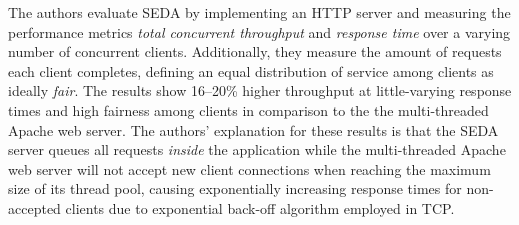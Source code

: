 \documentclass[12pt,a4paper]{book}
\begin{document}
The authors evaluate SEDA by implementing an HTTP server and measuring the performance metrics \emph{total concurrent throughput} and \emph{response time} over a varying number of concurrent clients.
Additionally, they measure the amount of requests each client completes, defining an equal distribution of service among clients as ideally \emph{fair}. %
The results show 16--20\% higher throughput at little-varying response times and high fairness among clients in comparison to the the multi-threaded Apache web server. %
The authors' explanation for these results is that the SEDA server queues all requests \emph{inside} the application while the multi-threaded Apache web server will not accept new client connections when reaching the maximum size of its thread pool, causing exponentially increasing response times for non-accepted clients due to exponential back-off algorithm employed in TCP.


\end{document}
